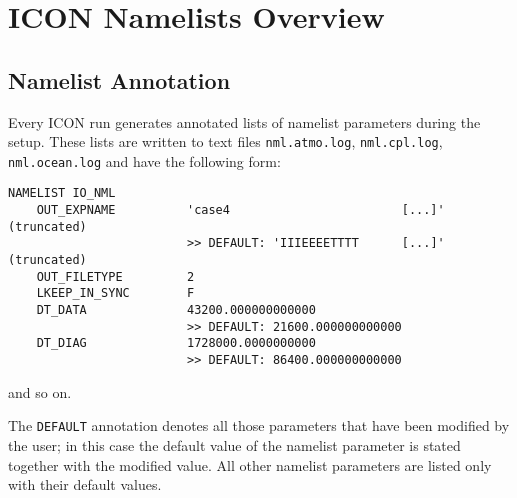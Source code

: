 
\chapter{ICON Namelists Overview}

\section{Namelist Annotation}
Every ICON run generates annotated lists of namelist parameters during the setup. These lists are written to text files {\tt nml.atmo.log}, {\tt nml.cpl.log}, {\tt nml.ocean.log} and have the following form:

\begin{small}
\begin{verbatim}
NAMELIST IO_NML
    OUT_EXPNAME          'case4                        [...]' (truncated)
                         >> DEFAULT: 'IIIEEEETTTT      [...]' (truncated)
    OUT_FILETYPE         2
    LKEEP_IN_SYNC        F
    DT_DATA              43200.000000000000
                         >> DEFAULT: 21600.000000000000
    DT_DIAG              1728000.0000000000
                         >> DEFAULT: 86400.000000000000
\end{verbatim}
\end{small}

and so on.

The {\tt DEFAULT} annotation denotes all those parameters that have been modified by the user; in this case the default value of the namelist parameter is stated together with the modified value. All other namelist parameters are listed only with their default values.

